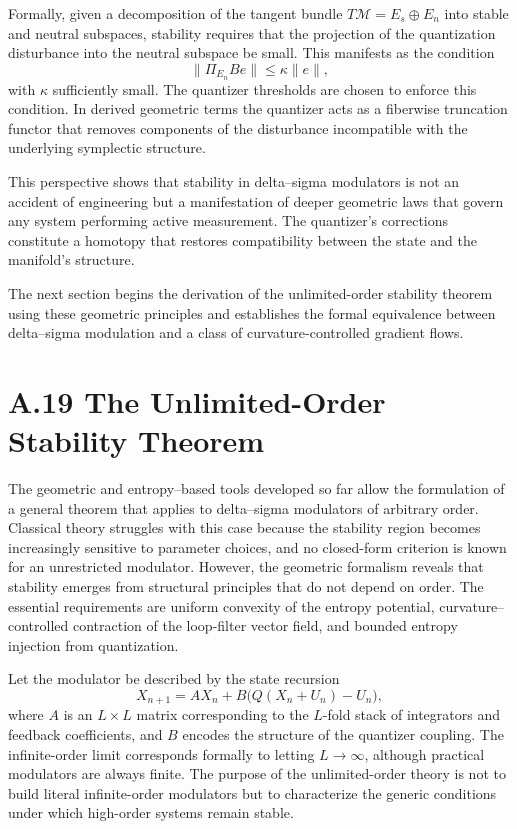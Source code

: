 Formally, given a decomposition of the tangent bundle \(T\mathcal{M} = E_s \oplus E_n\) into stable and neutral subspaces, stability requires that the projection of the quantization disturbance into the neutral subspace be small. This manifests as the condition
\[
\| \Pi_{E_n} B e \| \leq \kappa \|e\|,
\]
with \(\kappa\) sufficiently small. The quantizer thresholds are chosen to enforce this condition. In derived geometric terms the quantizer acts as a fiberwise truncation functor that removes components of the disturbance incompatible with the underlying symplectic structure.

This perspective shows that stability in delta–sigma modulators is not an accident of engineering but a manifestation of deeper geometric laws that govern any system performing active measurement. The quantizer's corrections constitute a homotopy that restores compatibility between the state and the manifold’s structure. 

The next section begins the derivation of the unlimited-order stability theorem using these geometric principles and establishes the formal equivalence between delta–sigma modulation and a class of curvature-controlled gradient flows.

\section{A.19 The Unlimited-Order Stability Theorem}

The geometric and entropy–based tools developed so far allow the formulation of a general theorem that applies to delta–sigma modulators of arbitrary order. Classical theory struggles with this case because the stability region becomes increasingly sensitive to parameter choices, and no closed-form criterion is known for an unrestricted modulator. However, the geometric formalism reveals that stability emerges from structural principles that do not depend on order. The essential requirements are uniform convexity of the entropy potential, curvature–controlled contraction of the loop-filter vector field, and bounded entropy injection from quantization.

Let the modulator be described by the state recursion
\[
X_{n+1} = A X_n + B \bigl( Q(X_n + U_n) - U_n \bigr),
\]
where \(A\) is an \(L \times L\) matrix corresponding to the \(L\)-fold stack of integrators and feedback coefficients, and \(B\) encodes the structure of the quantizer coupling. The infinite-order limit corresponds formally to letting \(L\to\infty\), although practical modulators are always finite. The purpose of the unlimited-order theory is not to build literal infinite-order modulators but to characterize the generic conditions under which high-order systems remain stable.

